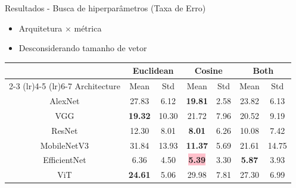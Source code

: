 \begin{frame}{Resultados - Busca de hiperparâmetros (Taxa de Erro)}
        \begin{itemize}
        \item Arquitetura $\times$ métrica
        \item Desconsiderando tamanho de vetor
    \end{itemize}
\begin{table}
\centering
\setlength{\tabcolsep}{3pt}
\begin{tabular}{ccc|cc|cc}
        & \multicolumn{2}{c}{Euclidean} & \multicolumn{2}{c}{Cosine} & \multicolumn{2}{c}{Both} \\
        \cmidrule(lr){2-3} \cmidrule(lr){4-5} \cmidrule(lr){6-7}
        Architecture & Mean & Std & Mean & Std & Mean & Std \\
        \midrule
        AlexNet         & 27.83 & 6.12 & \textbf{19.81} & 2.58 & 23.82 & 6.13 \\
        VGG             & \textbf{19.32} & 10.30 & 21.72 & 7.96 & 20.52 & 9.19 \\
        ResNet          & 12.30 & 8.01 & \textbf{8.01} & 6.26 & 10.08 & 7.42 \\
        MobileNetV3     & 31.84 & 13.93 & \textbf{11.37} & 5.69 & 21.61 & 14.75 \\
        EfficientNet    & 6.36 & 4.50 & \colorbox{pink}{\textbf{5.39}} & 3.30 & \textbf{5.87} & 3.93 \\
        ViT             & \textbf{24.61} & 5.06 & 29.98 & 7.81 & 27.30 & 6.99 \\
        \bottomrule
    \end{tabular}
\end{table}
\end{frame}

